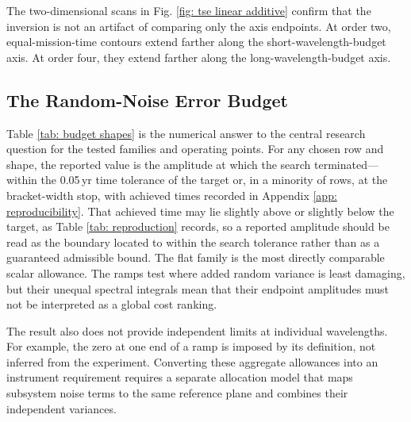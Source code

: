 \documentclass[12pt,a4paper]{article}
\numberwithin{equation}{section}
\numberwithin{figure}{section}
\numberwithin{table}{section}
\begin{document}
The two-dimensional scans in Fig. \ref{fig: tse linear additive} confirm that the inversion is not an artifact of comparing only the axis endpoints. At order two, equal-mission-time contours extend farther along the short-wavelength-budget axis. At order four, they extend farther along the long-wavelength-budget axis.



\subsection{The Random-Noise Error Budget} \label{sec: tse: budget result}
Table \ref{tab: budget shapes} is the numerical answer to the central research question for the tested families and operating points. For any chosen row and shape, the reported value is the amplitude at which the search terminated---within the 0.05\,yr time tolerance of the target or, in a minority of rows, at the bracket-width stop, with achieved times recorded in Appendix \ref{app: reproducibility}. That achieved time may lie slightly above or slightly below the target, as Table \ref{tab: reproduction} records, so a reported amplitude should be read as the boundary located to within the search tolerance rather than as a guaranteed admissible bound. The flat family is the most directly comparable scalar allowance. The ramps test where added random variance is least damaging, but their unequal spectral integrals mean that their endpoint amplitudes must not be interpreted as a global cost ranking.

The result also does not provide independent limits at individual wavelengths. For example, the zero at one end of a ramp is imposed by its definition, not inferred from the experiment. Converting these aggregate allowances into an instrument requirement requires a separate allocation model that maps subsystem noise terms to the same reference plane and combines their independent variances.
\end{document}
